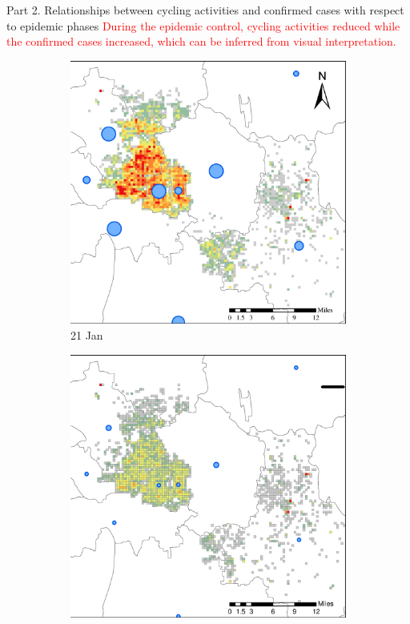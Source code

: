 \documentclass[preprints,ijgi,submit,moreauthors]{Definitions/mdpi}
\begin{document}
Part 2. Relationships between cycling activities and confirmed cases with respect to epidemic phases
\textcolor{red}{During the epidemic control, cycling activities reduced while the confirmed cases increased, which can be inferred from visual interpretation.}
\begin{figure}[H]
    \centering
    \begin{subfigure}{.3\textwidth}
        \includegraphics[width=\textwidth]{Figures/Relation_with_confrimed_cases/NewDistrictSSBD2020_01_21.eps}
        \caption{21 Jan}
    \end{subfigure}
    \begin{subfigure}{.3\textwidth}
        \includegraphics[width=\textwidth]{Figures/Relation_with_confrimed_cases/NewDistrictSSBD2020_01_25.eps}

\end{subfigure}
\end{figure}
\end{document}
